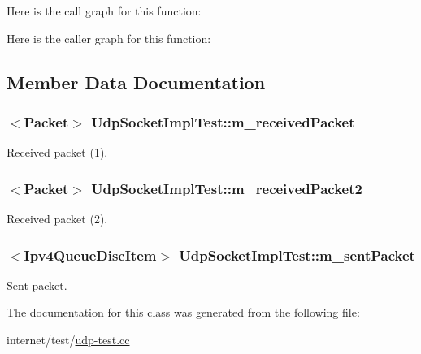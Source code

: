 Here is the call graph for this function\+:




Here is the caller graph for this function\+:




\subsection{Member Data Documentation}
\subsubsection[{\texorpdfstring{m\+\_\+received\+Packet}{m_receivedPacket}}]{$<${\bf Packet}$>$ Udp\+Socket\+Impl\+Test\+::m\+\_\+received\+Packet\hspace{0.3cm}{\ttfamily [private]}}\hypertarget{classUdpSocketImplTest_a991dccdef830885aab315ac9ee3c4a06}{}\label{classUdpSocketImplTest_a991dccdef830885aab315ac9ee3c4a06}


Received packet (1). 

\subsubsection[{\texorpdfstring{m\+\_\+received\+Packet2}{m_receivedPacket2}}]{$<${\bf Packet}$>$ Udp\+Socket\+Impl\+Test\+::m\+\_\+received\+Packet2\hspace{0.3cm}{\ttfamily [private]}}\hypertarget{classUdpSocketImplTest_adc156ecabbea0886db6024dbda1e8088}{}\label{classUdpSocketImplTest_adc156ecabbea0886db6024dbda1e8088}


Received packet (2). 

\subsubsection[{\texorpdfstring{m\+\_\+sent\+Packet}{m_sentPacket}}]{$<${\bf Ipv4\+Queue\+Disc\+Item}$>$ Udp\+Socket\+Impl\+Test\+::m\+\_\+sent\+Packet\hspace{0.3cm}{\ttfamily [private]}}\hypertarget{classUdpSocketImplTest_abbfcd84649bf743e5af93bf2a3d51d75}{}\label{classUdpSocketImplTest_abbfcd84649bf743e5af93bf2a3d51d75}


Sent packet. 



The documentation for this class was generated from the following file\+:\begin{DoxyCompactItemize}
\item 
internet/test/\hyperlink{udp-test_8cc}{udp-\/test.\+cc}\end{DoxyCompactItemize}
